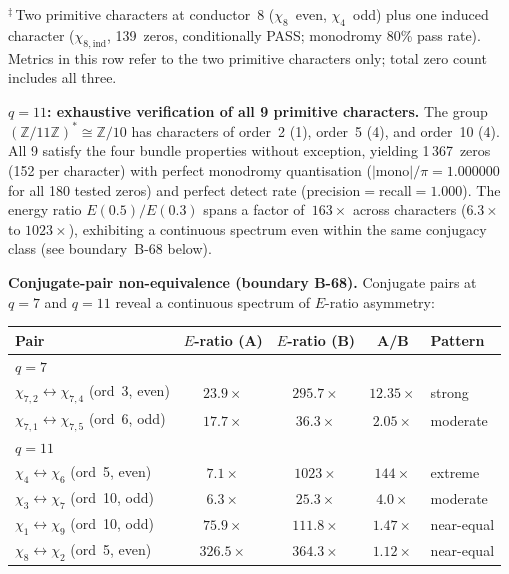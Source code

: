 \documentclass[11pt, a4paper]{article}
\theoremstyle{definition}
\theoremstyle{plain}
\begin{document}
\noindent
${}^\ddagger$\,Two primitive characters at conductor~8 ($\chi_8$~even,
$\chi_4$~odd) plus one induced character ($\chi_{8,\mathrm{ind}}$,
139~zeros, conditionally PASS; monodromy 80\% pass rate).
Metrics in this row refer to the two primitive characters only;
total zero count includes all three.

\medskip\noindent
\textbf{$q = 11$: exhaustive verification of all 9 primitive characters.}
The group $(\mathbb{Z}/11\mathbb{Z})^*\cong\mathbb{Z}/10$ has
characters of order~2 (1), order~5 (4), and order~10 (4).
All 9 satisfy the four bundle properties without exception,
yielding 1\,367~zeros (152 per character) with perfect monodromy
quantisation ($|\mathrm{mono}|/\pi = 1.000000$ for all 180 tested zeros)
and perfect detect rate (precision${=}$recall${=}1.000$).
The energy ratio $E(0.5)/E(0.3)$ spans a factor of~$163\times$
across characters ($6.3\times$ to $1023\times$), exhibiting a
continuous spectrum even within the same conjugacy class
(see boundary~B-68 below).

\medskip\noindent
\textbf{Conjugate-pair non-equivalence (boundary B-68).}
Conjugate pairs at $q{=}7$ and $q{=}11$ reveal a continuous spectrum of
$E$-ratio asymmetry:

\begin{center}
\small
\begin{tabular}{lcccl}
\toprule
Pair & $E$-ratio (A) & $E$-ratio (B) & A/B & Pattern \\
\midrule
\multicolumn{5}{l}{\textit{$q=7$}} \\
$\chi_{7,2} \leftrightarrow \chi_{7,4}$ (ord~3, even) & $23.9\times$ & $295.7\times$ & $12.35\times$ & strong \\
$\chi_{7,1} \leftrightarrow \chi_{7,5}$ (ord~6, odd) & $17.7\times$ & $36.3\times$ & $2.05\times$ & moderate \\
\midrule
\multicolumn{5}{l}{\textit{$q=11$}} \\
$\chi_4 \leftrightarrow \chi_6$ (ord~5, even) & $7.1\times$ & $1023\times$ & $144\times$ & extreme \\
$\chi_3 \leftrightarrow \chi_7$ (ord~10, odd) & $6.3\times$ & $25.3\times$ & $4.0\times$ & moderate \\
$\chi_1 \leftrightarrow \chi_9$ (ord~10, odd) & $75.9\times$ & $111.8\times$ & $1.47\times$ & near-equal \\
$\chi_8 \leftrightarrow \chi_2$ (ord~5, even) & $326.5\times$ & $364.3\times$ & $1.12\times$ & near-equal \\
\bottomrule
\end{tabular}
\end{center}
\end{document}
